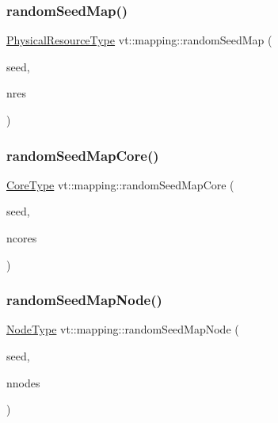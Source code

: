 \mbox{\label{namespacevt_1_1mapping_ab517203040d5d053a2293de5ea58bcf1}} 
\subsubsection{\texorpdfstring{random\+Seed\+Map()}{randomSeedMap()}}
{\footnotesize\ttfamily \hyperlink{namespacevt_a2dc36fcada816dc6d11774d650328ee9}{Physical\+Resource\+Type} vt\+::mapping\+::random\+Seed\+Map (\begin{DoxyParamCaption}\item[{\hyperlink{namespacevt_ae2e13198bdef4d5b8e603d6c1c7f0969}{Seed\+Type}}]{seed,  }\item[{\hyperlink{namespacevt_a2dc36fcada816dc6d11774d650328ee9}{Physical\+Resource\+Type}}]{nres }\end{DoxyParamCaption})}

\mbox{\label{namespacevt_1_1mapping_a35fdd9ccfcee759a8c0ba29b5c61d2a5}} 
\subsubsection{\texorpdfstring{random\+Seed\+Map\+Core()}{randomSeedMapCore()}}
{\footnotesize\ttfamily \hyperlink{namespacevt_a74b11b22c02feaabab8591acc87c7c52}{Core\+Type} vt\+::mapping\+::random\+Seed\+Map\+Core (\begin{DoxyParamCaption}\item[{\hyperlink{namespacevt_ae2e13198bdef4d5b8e603d6c1c7f0969}{Seed\+Type}}]{seed,  }\item[{\hyperlink{namespacevt_a74b11b22c02feaabab8591acc87c7c52}{Core\+Type}}]{ncores }\end{DoxyParamCaption})}

\mbox{\label{namespacevt_1_1mapping_accca64daff113b58cd733710ab4e0854}} 
\subsubsection{\texorpdfstring{random\+Seed\+Map\+Node()}{randomSeedMapNode()}}
{\footnotesize\ttfamily \hyperlink{namespacevt_a866da9d0efc19c0a1ce79e9e492f47e2}{Node\+Type} vt\+::mapping\+::random\+Seed\+Map\+Node (\begin{DoxyParamCaption}\item[{\hyperlink{namespacevt_ae2e13198bdef4d5b8e603d6c1c7f0969}{Seed\+Type}}]{seed,  }\item[{\hyperlink{namespacevt_a866da9d0efc19c0a1ce79e9e492f47e2}{Node\+Type}}]{nnodes }\end{DoxyParamCaption})}

